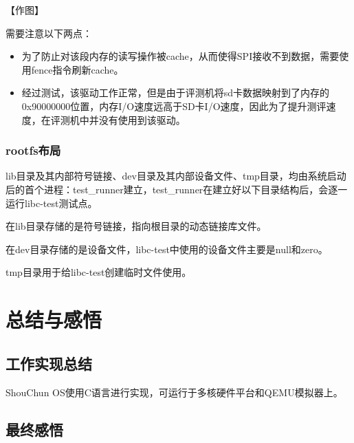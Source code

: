 \documentclass[UTF8,a4paper,10pt]{ctexart}
\begin{document}
【作图】

需要注意以下两点：

\begin{itemize}
  \item 为了防止对该段内存的读写操作被cache，从而使得SPI接收不到数据，需要使用fence指令刷新cache。
  \item 经过测试，该驱动工作正常，但是由于评测机将sd卡数据映射到了内存的0x90000000位置，内存I/O速度远高于SD卡I/O速度，因此为了提升测评速度，在评测机中并没有使用到该驱动。
\end{itemize}

\subsubsection{rootfs布局}

lib目录及其内部符号链接、dev目录及其内部设备文件、tmp目录，均由系统启动后的首个进程：test\_runner建立，test\_runner在建立好以下目录结构后，会逐一运行libc-test测试点。

在lib目录存储的是符号链接，指向根目录的动态链接库文件。

在dev目录存储的是设备文件，libc-test中使用的设备文件主要是null和zero。

tmp目录用于给libc-test创建临时文件使用。

\section{总结与感悟}

\subsection{工作实现总结}

ShouChun OS使用C语言进行实现，可运行于多核硬件平台和QEMU模拟器上。


\subsection{最终感悟}
\end{document}
